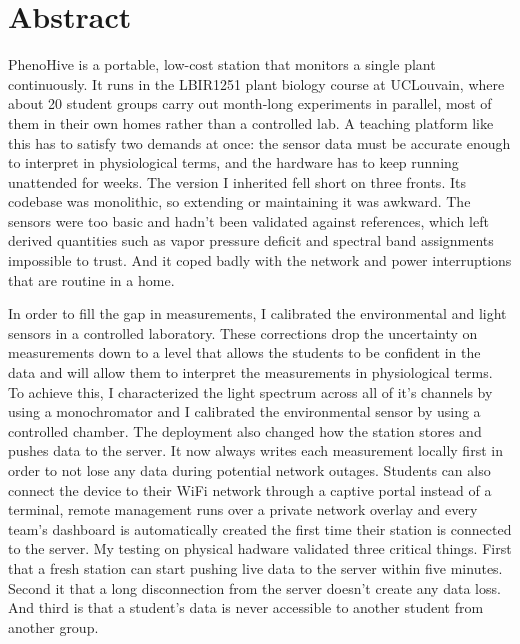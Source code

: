 ﻿\chapter*{Abstract}

PhenoHive is a portable, low-cost station that monitors a single plant continuously. It runs in the LBIR1251 plant biology course at UCLouvain, where about 20 student groups carry out month-long experiments in parallel, most of them in their own homes rather than a controlled lab. A teaching platform like this has to satisfy two demands at once: the sensor data must be accurate enough to interpret in physiological terms, and the hardware has to keep running unattended for weeks. The version I inherited fell short on three fronts. Its codebase was monolithic, so extending or maintaining it was awkward. The sensors were too basic and hadn't been validated against references, which left derived quantities such as vapor pressure deficit and spectral band assignments impossible to trust. And it coped badly with the network and power interruptions that are routine in a home.

In order to fill the gap in measurements, I calibrated the environmental and light sensors in a controlled laboratory. These corrections drop the uncertainty on measurements down to a level that allows the students to be confident in the data and will allow them to interpret the measurements in physiological terms. To achieve this, I characterized the light spectrum across all of it's channels by using a monochromator and I calibrated the environmental sensor by using a controlled chamber. The deployment also changed how the station stores and pushes data to the server. It now always writes each measurement locally first in order to not lose any data during potential network outages. Students can also connect the device to their WiFi network through a captive portal instead of a terminal, remote management runs over a private network overlay and every team's dashboard is automatically created the first time their station is connected to the server. My testing on physical hadware validated three critical things. First that a fresh station can start pushing live data to the server within five minutes. Second it that a long disconnection from the server doesn't create any data loss. And third is that a student's data is never accessible to another student from another group. 

